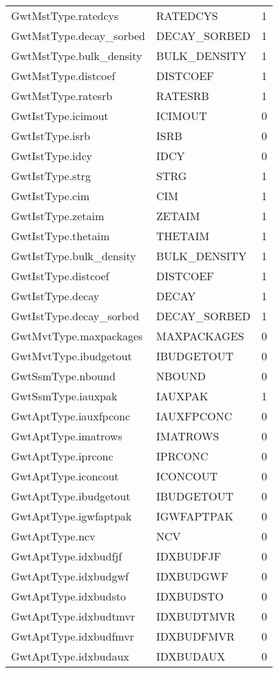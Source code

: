 \begin{longtable}{p{6cm} p{4cm} p{2cm} }
GwtMstType.ratedcys &  RATEDCYS & 1 \\ 
GwtMstType.decay\_sorbed &  DECAY\_SORBED & 1 \\ 
GwtMstType.bulk\_density &  BULK\_DENSITY & 1 \\ 
GwtMstType.distcoef &  DISTCOEF & 1 \\ 
GwtMstType.ratesrb &  RATESRB & 1 \\ 
GwtIstType.icimout &  ICIMOUT & 0 \\ 
GwtIstType.isrb &  ISRB & 0 \\ 
GwtIstType.idcy &  IDCY & 0 \\ 
GwtIstType.strg &  STRG & 1 \\ 
GwtIstType.cim &  CIM & 1 \\ 
GwtIstType.zetaim &  ZETAIM & 1 \\ 
GwtIstType.thetaim &  THETAIM & 1 \\ 
GwtIstType.bulk\_density &  BULK\_DENSITY & 1 \\ 
GwtIstType.distcoef &  DISTCOEF & 1 \\ 
GwtIstType.decay &  DECAY & 1 \\ 
GwtIstType.decay\_sorbed &  DECAY\_SORBED & 1 \\ 
GwtMvtType.maxpackages &  MAXPACKAGES & 0 \\ 
GwtMvtType.ibudgetout &  IBUDGETOUT & 0 \\ 
GwtSsmType.nbound &  NBOUND & 0 \\ 
GwtSsmType.iauxpak &  IAUXPAK & 1 \\ 
GwtAptType.iauxfpconc &  IAUXFPCONC & 0 \\ 
GwtAptType.imatrows &  IMATROWS & 0 \\ 
GwtAptType.iprconc &  IPRCONC & 0 \\ 
GwtAptType.iconcout &  ICONCOUT & 0 \\ 
GwtAptType.ibudgetout &  IBUDGETOUT & 0 \\ 
GwtAptType.igwfaptpak &  IGWFAPTPAK & 0 \\ 
GwtAptType.ncv &  NCV & 0 \\ 
GwtAptType.idxbudfjf &  IDXBUDFJF & 0 \\ 
GwtAptType.idxbudgwf &  IDXBUDGWF & 0 \\ 
GwtAptType.idxbudsto &  IDXBUDSTO & 0 \\ 
GwtAptType.idxbudtmvr &  IDXBUDTMVR & 0 \\ 
GwtAptType.idxbudfmvr &  IDXBUDFMVR & 0 \\ 
GwtAptType.idxbudaux &  IDXBUDAUX & 0 \\ 

\end{longtable}
